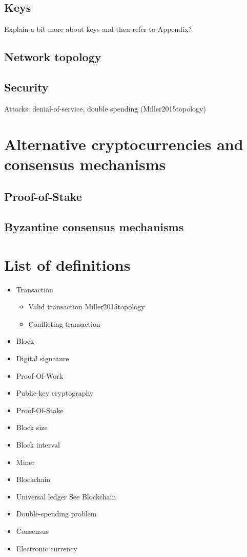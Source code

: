 \subsection{Keys}

Explain a bit more about keys and then refer to Appendix?

\subsection{Network topology}

\subsection{Security}

Attacks: denial-of-service, double spending (Miller2015topology)

\section{Alternative cryptocurrencies and consensus mechanisms}
\subsection{Proof-of-Stake}
\subsection{Byzantine consensus mechanisms}

\section{List of definitions}

\begin{itemize}
	\item{Transaction}
	\begin{itemize}
		\item{Valid transaction}
		Miller2015topology
		\item{Conflicting transaction}
	\end{itemize}
	\item{Block}
	\item{Digital signature}
	\item{Proof-Of-Work}
	\item{Public-key cryptography}
	\item{Proof-Of-Stake}
	\item{Block size}
	\item{Block interval}
	\item{Miner}
	\item{Blockchain}
	\item{Universal ledger} See Blockchain
	\item{Double-spending problem}
	\item{Consensus}
	\item{Electronic currency}
\end{itemize}